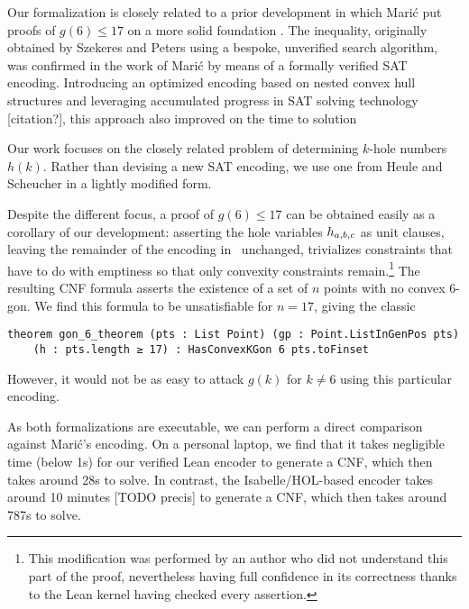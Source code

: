 Our formalization is closely related to a prior development
in which Marić put proofs of $g(6) \leq 17$ on a more solid foundation \cite{19maric_fast_formal_proof_erdos_szekeres_conjecture_convex_polygons_most_six_points}.
The inequality,
originally obtained by Szekeres and Peters \cite{06szekeres_computer_solution_17_point_erdos_szekeres_problem}
using a bespoke, unverified search algorithm,
was confirmed in the work of Marić
by means of a formally verified SAT encoding.
Introducing an optimized encoding based on nested convex hull structures
and leveraging accumulated progress in SAT solving technology [citation?],
this approach also improved on the time to solution

Our work focuses on the closely related problem
of determining $k$-hole numbers $h(k)$.
Rather than devising a new SAT encoding,
we use one from Heule and Scheucher \cite{emptyHexagonNumber}
in a lightly modified form.

Despite the different focus,
a proof of $g(6) \leq 17$ can be obtained easily
as a corollary of our development:
asserting the hole variables $\hvar_{a,b,c}$ as unit clauses,
leaving the remainder of the encoding in~ unchanged,
trivializes constraints that have to do with emptiness
so that only convexity constraints remain.\footnote{
This modification was performed by an author
who did not understand this part of the proof,
nevertheless having full confidence in its correctness
thanks to the Lean kernel having checked every assertion.}
The resulting CNF formula
asserts the existence of a set of $n$ points
with no convex $6$-gon.
We find this formula to be unsatisfiable for $n = 17$,
giving the classic
\begin{lstlisting}
theorem gon_6_theorem (pts : List Point) (gp : Point.ListInGenPos pts)
    (h : pts.length ≥ 17) : HasConvexKGon 6 pts.toFinset
\end{lstlisting}
However, it would not be as easy
to attack $g(k)$ for $k \neq 6$ using this particular encoding.

As both formalizations are executable,
we can perform a direct comparison against Marić's encoding.
On a personal laptop,
we find that it takes negligible time (below 1s)
for our verified Lean encoder to generate a CNF,
which then takes around 28s to solve.
In contrast,
the Isabelle/HOL-based encoder takes around 10 minutes [TODO precis] to generate a CNF,
which then takes around 787s to solve.

